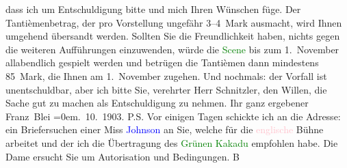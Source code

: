                dass ich um Entschuldigung bitte und mich Ihren Wünschen füge. Der Tantièmenbetrag,
               der pro Vorstellung ungefähr 3–4 Mark ausmacht, wird Ihnen umgehend übersandt werden.
               Sollten Sie die Freundlichkeit \introOben{}haben\introOben{}, nichts gegen die
               weiteren Aufführungen einzuwenden, würde die \textcolor{green}{Scene}{} bis zum 1. November allabendlich
               gespielt werden und betrügen die Tantièmen dann mindestens 85 Mark, die Ihnen am
                  1. November zugehen.\pend
           \pstart
           Und nochmals: der Vorfall ist unentschuldbar, aber ich bitte Sie, verehrter Herr
               Schnitzler, den Willen, die Sache gut zu machen als Entschuldigung zu nehmen.\pend
           \pstart
           Ihr ganz ergebener{\\[\baselineskip]}\spacefill\mbox{Franz Blei}\pend
           \leftskip=0em{}. 10. 1903.\pend
           \pstart
           P.S. Vor einigen Tagen schickte ich an die Adresse: \label{K_L01329_1v}\label{K_L01329_1h} ein Briefersuchen einer
                  Miss \textcolor{blue}{Johnson}{}\ledrightnote{\textcolor{blue}{Fanny Johnson}} an Sie, welche für die \textcolor{pink}{englische}{}\ledrightnote{\textcolor{pink}{England}} Bühne arbeitet und der ich die
                  Übertragung des {\pb}\textcolor{green}{Grünen Kakadu}{}\ledrightnote{\textcolor{green}{Der grüne Kakadu. Groteske in einem Akt}} empfohlen habe. Die Dame ersucht
                  Sie um Autorisation und Bedingungen. \spacefill\mbox{B}\pend
           \endnumbering{}  
      